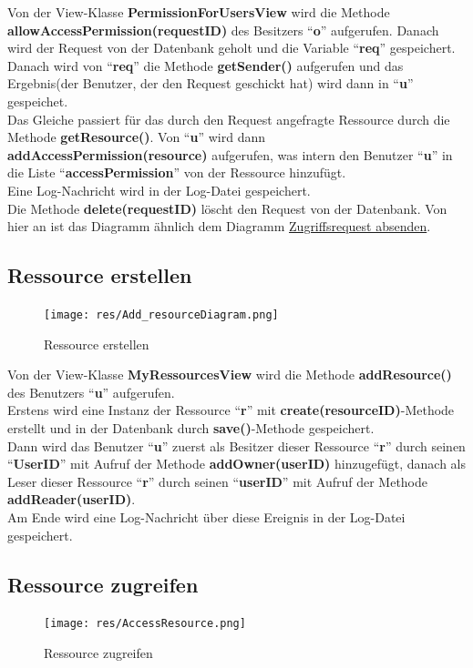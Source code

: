 \documentclass[parskip=full,11pt]{scrartcl}
\begin{document}
 Von der View-Klasse \textbf{PermissionForUsersView} wird die Methode \textbf{allowAccessPermission(requestID)} des Besitzers \enquote{\textbf{o}}  aufgerufen. Danach wird der Request von der Datenbank geholt und die Variable \enquote{\textbf{req}} gespeichert.\\ Danach wird von \enquote{\textbf{req}} die Methode \textbf{getSender()} aufgerufen und das Ergebnis(der Benutzer, der den Request geschickt hat) wird dann in \enquote{\textbf{u}} gespeichet.\\ Das Gleiche passiert für das durch den Request angefragte Ressource durch die Methode \textbf{getResource()}. Von \enquote{\textbf{u}} wird dann \textbf{addAccessPermission(resource)} aufgerufen, was intern den Benutzer \enquote{\textbf{u}} in die Liste \enquote{\textbf{accessPermission}} von der Ressource hinzufügt.\\
Eine Log-Nachricht wird in der Log-Datei gespeichert.\\ Die Methode \textbf{delete(requestID)} löscht den Request von der Datenbank. Von hier an ist das Diagramm ähnlich dem Diagramm \hyperref[fig:sendAccReq]{Zugriffsrequest absenden}. 
 
  \newpage
 \subsection{Ressource erstellen}
 \begin{figure}[ht!]
 	\centering
 	\texttt{[image: res/Add\_resourceDiagram.png]}
 	\caption{Ressource erstellen}
 \end{figure}
 
Von der View-Klasse \textbf{MyRessourcesView} wird die Methode \textbf{addResource()} des Benutzers \enquote{\textbf{u}}  aufgerufen.\\ Erstens wird eine Instanz der Ressource \enquote{\textbf{r}} mit \textbf{create(resourceID)}-Methode  erstellt und in der Datenbank  durch \textbf{save()}-Methode gespeichert.\\ Dann wird das Benutzer \enquote{\textbf{u}} zuerst als Besitzer dieser Ressource \enquote{\textbf{r}} durch seinen \enquote{\textbf{UserID}} mit Aufruf der Methode \textbf{addOwner(userID)} hinzugefügt, danach als Leser dieser Ressource \enquote{\textbf{r}} durch seinen \enquote{\textbf{userID}} mit Aufruf der Methode \textbf{addReader(userID)}.\\Am Ende wird eine Log-Nachricht über diese Ereignis in der Log-Datei gespeichert.

    \newpage
 \subsection{Ressource zugreifen}
 \begin{figure}[ht!]
 	\centering
 	\texttt{[image: res/AccessResource.png]}
 	\caption{Ressource zugreifen}
 \end{figure}
 
\end{document}
